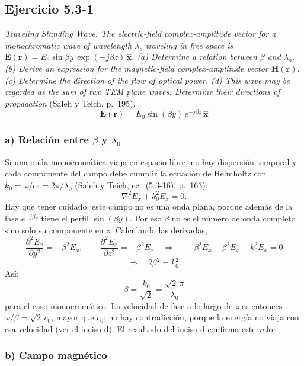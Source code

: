 \documentclass{article}
\newcommand{\xh}{\hat{\mathbf{x}}}
\begin{document}
\subsection{Ejercicio 5.3-1}

\emph{Traveling Standing Wave. The electric-field complex-amplitude vector for a monochromatic wave of
wavelength $\lambda_o$ traveling in free space is $\mathbf E(\mathbf r)=E_0\sin\beta y\,\exp(-j\beta z)\,\xh$.
(a) Determine a relation between $\beta$ and $\lambda_o$. (b) Derive an expression for the magnetic-field
complex-amplitude vector $\mathbf H(\mathbf r)$. (c) Determine the direction of the flow of optical power.
(d) This wave may be regarded as the sum of two TEM plane waves. Determine their directions of
propagation} (Saleh y Teich, p.~195).
\[
\mathbf E(\mathbf r)=E_0\sin(\beta y)\,e^{-j\beta z}\,\xh
\]

\subsubsection*{a) Relación entre $\beta$ y $\lambda_0$}

Si una onda monocromática viaja en espacio libre, no hay dispersión temporal y cada componente del
campo debe cumplir la ecuación de Helmholtz con $k_0=\omega/c_0=2\pi/\lambda_0$
(Saleh y Teich, ec.~(5.3-16), p.~163):
\[
\nabla^2E_x+k_0^2E_x=0 .
\]
Hay que tener cuidado: este campo no es una onda plana, porque además de la fase $e^{-j\beta z}$ tiene
el perfil $\sin(\beta y)$. Por eso $\beta$ no es el número de onda completo sino solo su componente en
$z$. Calculando las derivadas,
\[
\frac{\partial^2E_x}{\partial y^2}=-\beta^2E_x,\qquad
\frac{\partial^2E_x}{\partial z^2}=-\beta^2E_x
\quad\Rightarrow\quad
-\beta^2E_x-\beta^2E_x+k_0^2E_x=0
\]
\[
\Rightarrow\quad 2\beta^2=k_0^2 .
\]
Así:
\[
\boxed{\;\beta=\frac{k_0}{\sqrt2}=\frac{\sqrt2\,\pi}{\lambda_0}\;}
\]
para el caso monocromático. La velocidad de fase a lo largo de $z$ es entonces
$\omega/\beta=\sqrt2\,c_0$, mayor que $c_0$; no hay contradicción, porque la energía no viaja con esa
velocidad (ver el inciso d). El resultado del inciso d confirma este valor.

\subsubsection*{b) Campo magnético}
\end{document}
